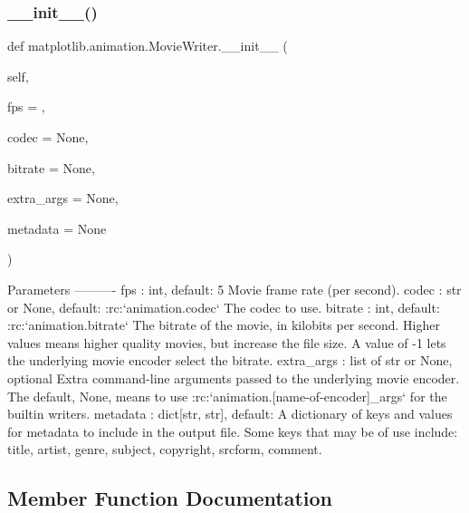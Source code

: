 \subsubsection{\texorpdfstring{\+\_\+\+\_\+init\+\_\+\+\_\+()}{\_\_init\_\_()}}
{\footnotesize\ttfamily def matplotlib.\+animation.\+Movie\+Writer.\+\_\+\+\_\+init\+\_\+\+\_\+ (\begin{DoxyParamCaption}\item[{}]{self,  }\item[{}]{fps = {},  }\item[{}]{codec = {\ttfamily None},  }\item[{}]{bitrate = {\ttfamily None},  }\item[{}]{extra\+\_\+args = {\ttfamily None},  }\item[{}]{metadata = {\ttfamily None} }\end{DoxyParamCaption})}

\begin{DoxyVerb}Parameters
----------
fps : int, default: 5
    Movie frame rate (per second).
codec : str or None, default: :rc:`animation.codec`
    The codec to use.
bitrate : int, default: :rc:`animation.bitrate`
    The bitrate of the movie, in kilobits per second.  Higher values
    means higher quality movies, but increase the file size.  A value
    of -1 lets the underlying movie encoder select the bitrate.
extra_args : list of str or None, optional
    Extra command-line arguments passed to the underlying movie
    encoder.  The default, None, means to use
    :rc:`animation.[name-of-encoder]_args` for the builtin writers.
metadata : dict[str, str], default: {}
    A dictionary of keys and values for metadata to include in the
    output file. Some keys that may be of use include:
    title, artist, genre, subject, copyright, srcform, comment.
\end{DoxyVerb}
 

\subsection{Member Function Documentation}
\mbox{\label{classmatplotlib_1_1animation_1_1MovieWriter_a82b63a3c5e363a36634f0b28fd47b3a7}} 

